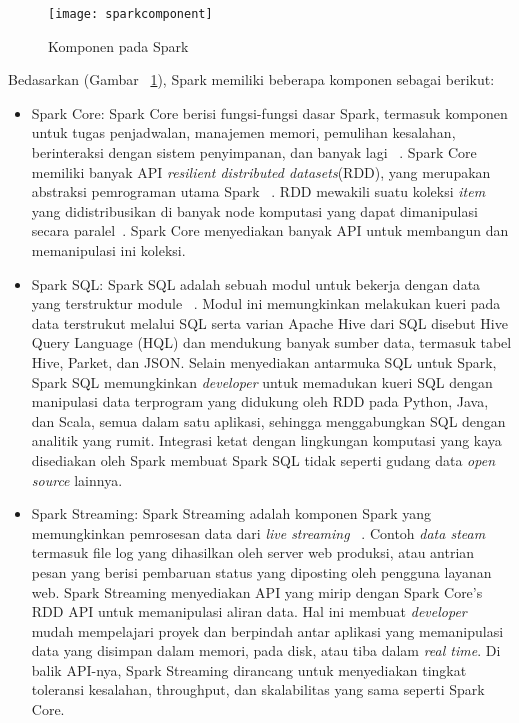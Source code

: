 \begin{figure}[H]
    \centering  
    \texttt{[image: sparkcomponent]}  
    \caption[Komponen pada Spark]{Komponen pada Spark} 
    \label{fig:sparkcomponent} 
\end{figure}

Bedasarkan (Gambar ~\ref{fig:sparkcomponent}), Spark memiliki beberapa komponen sebagai berikut:

\begin{itemize}

\item Spark Core:
Spark Core berisi fungsi-fungsi dasar Spark, termasuk komponen untuk tugas penjadwalan, manajemen memori, pemulihan kesalahan, berinteraksi dengan sistem penyimpanan,
dan banyak lagi ~\cite{holdenkarau:07:ls}. Spark Core memiliki banyak API \textit{resilient distributed datasets}(RDD), yang merupakan abstraksi pemrograman utama Spark ~\cite{holdenkarau:07:ls}. RDD mewakili suatu koleksi \textit{item} yang didistribusikan di banyak node komputasi yang dapat dimanipulasi
secara paralel~\cite{holdenkarau:07:ls}. Spark Core menyediakan banyak API untuk membangun dan memanipulasi ini
koleksi. 

\item Spark SQL: Spark SQL adalah sebuah modul untuk bekerja dengan data yang terstruktur module ~\cite{holdenkarau:07:ls}. Modul ini memungkinkan melakukan kueri pada data terstrukut melalui SQL serta varian Apache Hive dari SQL disebut Hive Query Language (HQL) dan mendukung banyak sumber data, termasuk tabel Hive, Parket, dan JSON. Selain menyediakan antarmuka SQL untuk Spark, Spark SQL memungkinkan \textit{developer} untuk memadukan kueri SQL dengan manipulasi data terprogram yang didukung oleh RDD pada Python, Java, dan Scala, semua dalam satu aplikasi, sehingga menggabungkan SQL dengan analitik yang rumit. Integrasi ketat dengan lingkungan komputasi yang kaya disediakan oleh Spark membuat Spark SQL tidak seperti gudang data \textit{open source} lainnya.

\item Spark Streaming: Spark Streaming adalah komponen Spark yang memungkinkan pemrosesan data dari \textit{live streaming} ~\cite{holdenkarau:07:ls}. Contoh \textit{data steam} termasuk file log yang dihasilkan oleh server web produksi, atau antrian pesan yang berisi pembaruan status yang diposting oleh pengguna layanan web. Spark Streaming menyediakan API yang mirip dengan  Spark Core's RDD API untuk memanipulasi aliran data. Hal ini membuat \textit{developer} mudah mempelajari proyek dan berpindah antar aplikasi yang memanipulasi data yang disimpan dalam memori, pada disk, atau tiba dalam \textit{real time}. Di balik API-nya, Spark Streaming dirancang untuk menyediakan tingkat toleransi kesalahan, throughput, dan skalabilitas yang sama seperti Spark Core.


\end{itemize}
